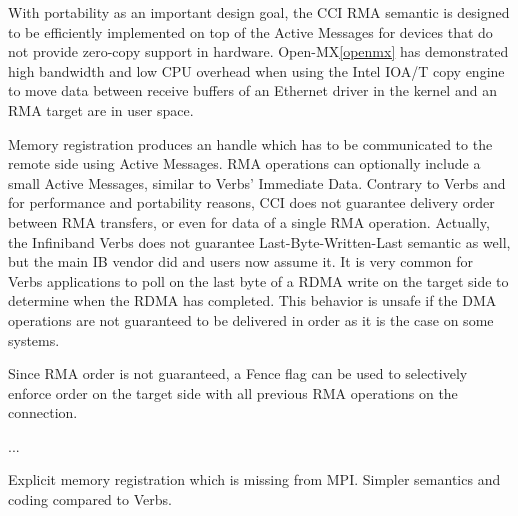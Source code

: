 With portability as an important design goal, the CCI RMA semantic is 
designed to be efficiently implemented on top of the Active Messages 
for devices that do not provide zero-copy support in hardware. 
Open-MX\ref{openmx} has demonstrated high bandwidth and low CPU 
overhead when using the Intel IOA/T copy engine to move data between receive 
buffers of an Ethernet driver in the kernel and an RMA target are in user 
space.

Memory registration produces an handle which has to be communicated to the 
remote side using Active Messages. RMA operations can optionally include a 
small Active Messages, similar to Verbs' Immediate Data. Contrary to Verbs 
and for performance and portability reasons, CCI does not guarantee delivery 
order between RMA transfers, or even for data of a single RMA operation. 
Actually, the Infiniband Verbs does not guarantee Last-Byte-Written-Last 
semantic as well, but the main IB vendor did and users now assume it. It is 
very common for Verbs applications to poll on the last byte of a RDMA write 
on the target side to determine when the RDMA has completed. This behavior is 
unsafe if the DMA operations are not guaranteed to be delivered in order as 
it is the case on some systems.

Since RMA order is not guaranteed, a Fence flag can be used to selectively 
enforce order on the target side with all previous RMA operations on the 
connection.

...

 Explicit memory registration which is missing from MPI. Simpler semantics and coding compared to Verbs.
